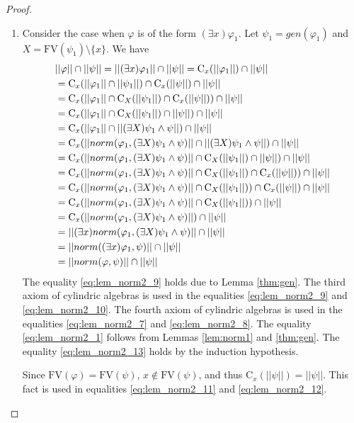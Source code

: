 \documentclass{lmcs}
\def\C{\textrm{C}}
\def\norm{norm}
\def\FV{\textrm{FV}}
\def\gen{gen}
\begin{document}
\begin{proof}
\begin{enumerate}
\item Consider the case when $\varphi$ is of the form $(\exists x)\varphi_1$. Let $\psi_1=\gen(\varphi_1)$ and $X=\FV(\psi_1)\setminus\{x\}$.  We have
\begin{align}
&||\varphi||\cap||\psi||=||(\exists x)\varphi_1||\cap||\psi||=\C_x(||\varphi_1||)\cap||\psi||\notag\\
&=\C_x(||\varphi_1||\cap||\psi_1||)\cap\C_x(||\psi||)\cap||\psi||\label{eq:lem_norm2_9}\\
&=\C_x(||\varphi_1||\cap\C_{X}(||\psi_1||)\cap\C_x(||\psi||))\cap||\psi||\label{eq:lem_norm2_7}\\
&=\C_x(||\varphi_1||\cap\C_{X}(||\psi_1||)\cap||\psi||)\cap||\psi||\label{eq:lem_norm2_11}\\
&=\C_x(||\varphi_1||\cap||(\exists X)\psi_1\wedge\psi||)\cap||\psi||\notag\\
&=\C_x(||\norm(\varphi_1,(\exists X)\psi_1\wedge\psi)||\cap||(\exists X)\psi_1\wedge\psi||)\cap||\psi||\label{eq:lem_norm2_13}\\
&=\C_x(||\norm(\varphi_1,(\exists X)\psi_1\wedge\psi)||\cap\C_X(||\psi_1||)\cap||\psi||)\cap||\psi||\notag\\
&=\C_x(||\norm(\varphi_1,(\exists X)\psi_1\wedge\psi)||\cap\C_X(||\psi_1||)\cap\C_x(||\psi||))\cap||\psi||\label{eq:lem_norm2_12}\\
&=\C_x(||\norm(\varphi_1,(\exists X)\psi_1\wedge\psi)||\cap\C_X(||\psi_1||))\cap\C_x(||\psi||)\cap||\psi||\label{eq:lem_norm2_8}\\
&=\C_x(||\norm(\varphi_1,(\exists X)\psi_1\wedge\psi)||\cap\C_X(||\psi_1||))\cap||\psi||\label{eq:lem_norm2_10}\\
&=\C_x(||\norm(\varphi_1,(\exists X)\psi_1\wedge\psi)||)\cap||\psi||\label{eq:lem_norm2_1}\\
&=||(\exists x)\norm(\varphi_1,(\exists X)\psi_1\wedge\psi)||\cap||\psi||\notag\\
&=||\norm((\exists x)\varphi_1,\psi)||\cap||\psi||\notag\\
&=||\norm(\varphi,\psi)||\cap||\psi||\notag
\end{align}
The equality \eqref{eq:lem_norm2_9} holds due to Lemma \ref{thm:gen}.
The third axiom of cylindric algebras is used in the equalities \eqref{eq:lem_norm2_9} and \eqref{eq:lem_norm2_10}.
The fourth axiom of cylindric algebras is used in the equalities \eqref{eq:lem_norm2_7} and \eqref{eq:lem_norm2_8}.
The equality \eqref{eq:lem_norm2_1}  follows from Lemmas \ref{lem:norm1} and \ref{thm:gen}. The equality \eqref{eq:lem_norm2_13} holds by the induction hypothesis.

Since $\FV(\varphi)=\FV(\psi)$, $x\notin\FV(\psi)$, and thus $\C_x(||\psi||)=||\psi||$. This fact is used in equalities \eqref{eq:lem_norm2_11} and \eqref{eq:lem_norm2_12}. \qedhere
 
\end{enumerate}

 
\end{proof}
\end{document}
